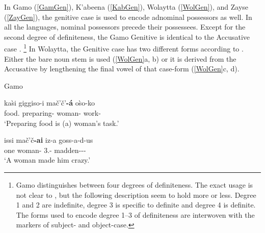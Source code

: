 In Gamo (\ref{GamGen}), K'abeena (\ref{KabGen}), Wolaytta (\ref{WolGen}), and Zayse (\ref{ZayGen}), the genitive case is used  to encode adnominal possessors as well. 
In all the languages, nominal possessors precede their possessees.
Except for the second degree of definiteness, the Gamo Genitive is identical to the Accusative case \citep[380]{Hompo:1990}.
\footnote{Gamo distinguishes between four degrees of definiteness. 
The exact usage is not clear to \citet[367]{Hompo:1990}, but the following description seem to hold more or less.
Degree 1 and 2 are indefinite, degree 3 is specific to definite and degree 4 is definite. 
The forms used to encode degree 1--3 of definiteness are interwoven with the markers of subject- and object-case.}
In Wolaytta,  the Genitive case has two different forms according to \citet[217--218]{Lamberti:1997}. 
Either the bare noun stem is used (\ref{WolGen}a, b) or it is derived from the Accusative by lengthening the final vowel of that case-form (\ref{WolGen}c, d).

\pagebreak
\begin{exe}\ex\label{GamGen} {Gamo} \citep[Omotic; Ethiopia; ][368, 375]{Hompo:1990}\nopagebreak[4]
\begin{xlist}
\ex\gll ka\`si giggiso-i ma\v c'\v c'\textbf{-\'a} o\`so-ko\\
food.\acc{} preparing-\nom{} woman-\gen{} work-\cop{}\\
`Preparing food is (a) woman's task.'

\ex\gll issi ma\v c'\v c\textbf{-ai} iz-a goss-a-d-us\\
one woman-\nom{} 3\sg{}.\mas{}-\acc{} madden-\persm-\tns{}-\complx{}\\
`A woman made him crazy.'
\end{xlist}
\end{exe}

